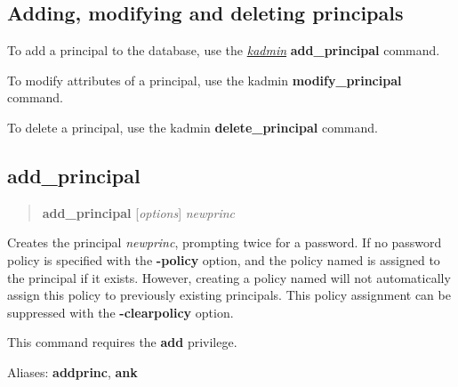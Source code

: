 \documentclass[letterpaper,10pt,english]{sphinxmanual}
\begin{document}
\subsection{Adding, modifying and deleting principals}
\label{admin/database:add-mod-del-princs}\label{admin/database:adding-modifying-and-deleting-principals}
To add a principal to the database, use the {\hyperref[admin/admin_commands/kadmin_local:kadmin-1]{\emph{kadmin}}}
\textbf{add\_principal} command.

To modify attributes of a principal, use the kadmin
\textbf{modify\_principal} command.

To delete a principal, use the kadmin \textbf{delete\_principal} command.


\subsection{add\_principal}
\label{admin/database:add-principal}\begin{quote}

\textbf{add\_principal} {[}\emph{options}{]} \emph{newprinc}
\end{quote}

Creates the principal \emph{newprinc}, prompting twice for a password.  If
no password policy is specified with the \textbf{-policy} option, and the
policy named  is assigned to the principal if it exists.
However, creating a policy named  will not automatically
assign this policy to previously existing principals.  This policy
assignment can be suppressed with the \textbf{-clearpolicy} option.

This command requires the \textbf{add} privilege.

Aliases: \textbf{addprinc}, \textbf{ank}
\end{document}
